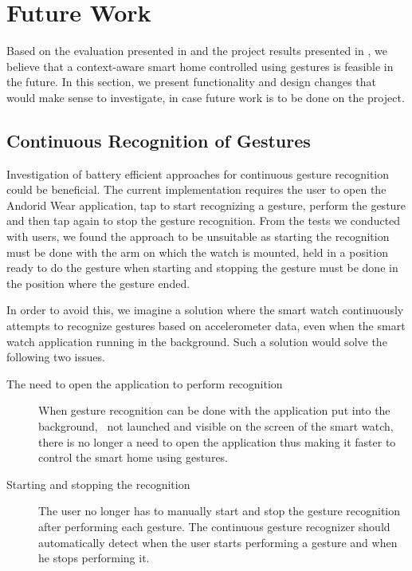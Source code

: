 \section{Future Work}
\label{sec:conclusion:future-work}

Based on the evaluation presented in  and the project results presented in , we believe that a context-aware smart home controlled using gestures is feasible in the future. 
In this section, we present functionality and design changes that would make sense to investigate, in case future work is to be done on the project.

\subsection{Continuous Recognition of Gestures}

Investigation of battery efficient approaches for continuous gesture recognition could be beneficial. The current implementation requires the user to open the Andorid Wear application, tap to start recognizing a gesture, perform the gesture and then tap again to stop the gesture recognition. From the tests we conducted with users, we found the approach to be unsuitable as starting the recognition must be done with the arm on which the watch is mounted, held in a position ready to do the gesture when starting and stopping the gesture must be done in the position where the gesture ended.

In order to avoid this, we imagine a solution where the smart watch continuously attempts to recognize gestures based on accelerometer data, even when the smart watch application running in the background. Such a solution would solve the following two issues.

\begin{description}
\item[The need to open the application to perform recognition] When gesture recognition can be done with the application put into the background, \ie~not launched and visible on the screen of the smart watch, there is no longer a need to open the application thus making it faster to control the smart home using gestures.
\item[Starting and stopping the recognition] The user no longer has to manually start and stop the gesture recognition after performing each gesture. The continuous gesture recognizer should automatically detect when the user starts performing a gesture and when he stops performing it.
\end{description}

